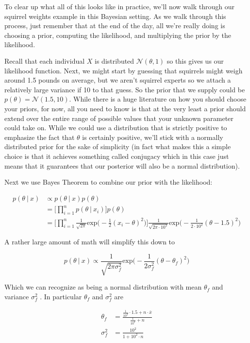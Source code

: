 \documentclass[12pt,twoside]{reedthesis}
\begin{document}
To clear up what all of this looks like in practice, we'll now walk through our squirrel weights example in this Bayesian setting. As we walk through this process, just remember that at the end of the day, all we're really doing is choosing a prior, computing the likelihood, and multiplying the prior by the likelihood.

Recall that each individual \(X\) is distributed \(\mathcal{N}(\theta, 1)\) so this gives us our likelihood function. Next, we might start by guessing that squirrels might weigh around 1.5 pounds on average, but we aren't squirrel experts so we attach a relatively large variance if 10 to that guess. So the prior that we supply could be \(p(\theta) = \mathcal{N}(1.5,10)\). While there is a huge literature on how you should choose your priors, for now, all you need to know is that at the very least a prior should extend over the entire range of possible values that your unknown parameter could take on. While we could use a distribution that is strictly positive to emphasize the fact that \(\theta\) is certainly positive, we'll stick with a normally distributed prior for the sake of simplicity (in fact what makes this a simple choice is that it achieves something called conjugacy which in this case just means that it guarantees that our posterior will also be a normal distribution).

Next we use Bayes Theorem to combine our prior with the likelihood:

\[
\begin{aligned}
p(\theta \ | \ x) &\propto p(\theta \ | \ x)p(\theta) \\
&= \bigg[\prod_{i=1}^np(\theta \ | \ x_i)\bigg]p(\theta) \\
&= \bigg[\prod_{i=1}^n\frac{1}{\sqrt{2\pi}}\text{exp}\bigg(-\frac{1}{2}(x_i - \theta )^2\bigg)\bigg]\frac{1}{\sqrt{2\pi\cdot10^2}}\text{exp}\bigg(-\frac{1}{2\cdot10^2}(\theta - 1.5)^2\bigg) 
\end{aligned}
\]

A rather large amount of math will simplify this down to

\[
p(\theta \ | \ x) \propto \frac{1}{\sqrt{2\pi\sigma_f^2}}\text{exp}\bigg(-\frac{1}{2\sigma_f^2}(\theta - \theta_f)^2\bigg)
\]

Which we can recognize as being a normal distribution with mean \(\theta_f\) and variance \(\sigma^2_f\) . In particular \(\theta_f\) and \(\sigma^2_f\) are

\[
\begin{aligned}
\theta_f &= \frac{\frac{1}{10^2}\cdot1.5 + n\cdot \bar{x}}{\frac{1}{10^2} + n} \\
\sigma^2_f &= \frac{10^2}{1 + 10^2\cdot n}
\end{aligned}
\]
\end{document}
